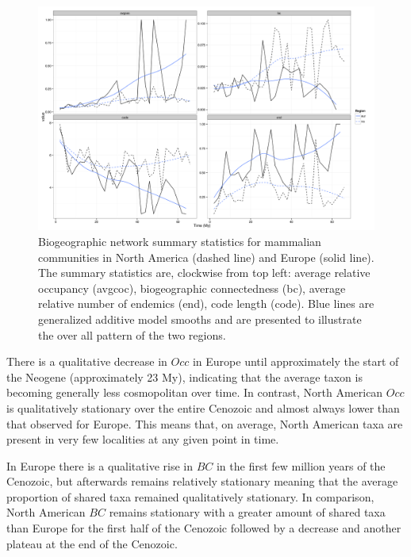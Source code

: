 \documentclass[12pt,letterpaper]{article}
\begin{document}
\begin{figure}[ht]
  \begin{center}
    \includegraphics[height = 0.4\textheight, keepaspectratio = true]{figure/gen_bin}
  \end{center}
  \caption{Biogeographic network summary statistics for mammalian communities in North America (dashed line) and Europe (solid line). The summary statistics are, clockwise from top left: average relative occupancy (avgcoc), biogeographic connectedness (bc), average relative number of endemics (end), code length (code). Blue lines are generalized additive model smooths and are presented to illustrate the over all pattern of the two regions.} 
  \label{fig:mam_tot}
\end{figure}

There is a qualitative decrease in \(Occ\) in Europe until approximately the start of the Neogene (approximately 23 My), indicating that the average taxon is becoming generally less cosmopolitan over time. In contrast, North American \(Occ\) is qualitatively stationary over the entire Cenozoic and almost always lower than that observed for Europe. This means that, on average, North American taxa are present in very few localities at any given point in time.

In Europe there is a qualitative rise in \(BC\) in the first few million years of the Cenozoic, but afterwards remains relatively stationary meaning that the average proportion of shared taxa remained qualitatively stationary. In comparison, North American \(BC\) remains stationary with a greater amount of shared taxa than Europe for the first half of the Cenozoic followed by a decrease and another plateau at the end of the Cenozoic.
\end{document}
